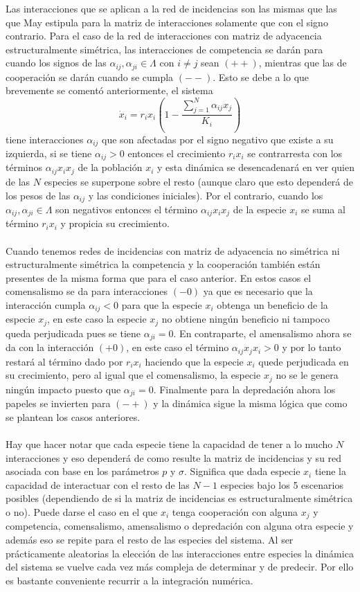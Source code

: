 Las interacciones que se aplican a la red de incidencias son las mismas que las que May estipula para la matriz de interacciones solamente que con el signo contrario. Para el caso de la red de interacciones con matriz de adyacencia estructuralmente simétrica, las interacciones de competencia se darán para cuando los signos de las $\alpha_{ij},\alpha_{ji}\in\Lambda$ con $i\neq j$ sean $(++)$, mientras que las de cooperación se darán cuando se cumpla $(--)$. Esto se debe a lo que brevemente se comentó anteriormente, el sistema
$$
\dot{x}_i=r_ix_i\left (1 - \frac{\sum_{j=1}^{N}\alpha_{ij}x_j}{K_i}\right )
$$
tiene interacciones $\alpha_{ij}$ que son afectadas por el signo negativo que existe a su izquierda, si se tiene $\alpha_{ij}>0$ entonces el crecimiento $r_ix_i$ se contrarresta con los términos $\alpha_{ij}x_ix_j$ de la población $x_i$ y esta dinámica se desencadenará en ver quien de las $N$ especies se superpone sobre el resto (aunque claro que esto dependerá de los pesos de las $\alpha_{ij}$ y las condiciones iniciales). Por el contrario, cuando los $\alpha_{ij},\alpha_{ji}\in\Lambda$ son negativos entonces el término $\alpha_{ij}x_ix_j$ de la especie $x_i$ se suma al término $r_ix_i$ y propicia su crecimiento.\\
\\
Cuando tenemos redes de incidencias con matriz de adyacencia no simétrica ni estructuralmente simétrica la competencia y la cooperación también están presentes de la misma forma  que para el caso anterior. En estos casos el comensalismo se da para interacciones $(-0)$ ya que es necesario que la interacción cumpla $\alpha_{ij}<0$ para que la especie $x_i$ obtenga un beneficio de la especie $x_j$, en este caso la especie $x_j$ no obtiene ningún beneficio ni tampoco queda perjudicada pues se tiene $\alpha_{ji}=0$. En contraparte, el amensalismo ahora se da con la interacción $(+0)$, en este caso el término $\alpha_{ij}x_jx_i>0$ y por lo tanto restará al término dado por $r_ix_i$ haciendo que la especie $x_i$ quede perjudicada en su crecimiento, pero al igual que el comensalismo, la especie $x_j$ no se le genera ningún impacto puesto que $\alpha_{ji}=0$. Finalmente para la depredación ahora los papeles se invierten para $(-+)$ y la dinámica sigue la misma lógica que como se plantean los casos anteriores.\\
\\
Hay que hacer notar que cada especie tiene la capacidad de tener a lo mucho $N$ interacciones y eso dependerá de como resulte la matriz de incidencias y su red asociada con base en los parámetros $p$ y $\sigma$. Significa que dada especie $x_i$ tiene la capacidad de interactuar con el resto de las $N-1$ especies bajo los 5 escenarios posibles (dependiendo de si la matriz de incidencias es estructuralmente simétrica o no). Puede darse el caso en el que $x_i$ tenga cooperación con alguna $x_j$ y competencia, comensalismo, amensalismo o depredación con alguna otra especie y además eso se repite para el resto de las especies del sistema. Al ser prácticamente aleatorias la elección de las interacciones entre especies la dinámica del sistema se vuelve cada vez más compleja de determinar y de predecir. Por ello es bastante conveniente recurrir a la integración numérica.

